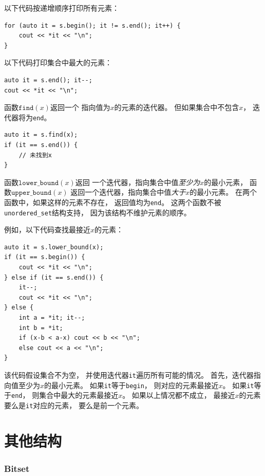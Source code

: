以下代码按递增顺序打印所有元素：
\begin{lstlisting}
for (auto it = s.begin(); it != s.end(); it++) {
    cout << *it << "\n";
}
\end{lstlisting}
以下代码打印集合中最大的元素：
\begin{lstlisting}
auto it = s.end(); it--;
cout << *it << "\n";
\end{lstlisting}

函数$\texttt{find}(x)$返回一个
指向值为$x$的元素的迭代器。
但如果集合中不包含$x$，
迭代器将为\texttt{end}。

\begin{lstlisting}
auto it = s.find(x);
if (it == s.end()) {
    // 未找到x
}
\end{lstlisting}

函数$\texttt{lower\_bound}(x)$返回
一个迭代器，指向集合中值\emph{至少为}$x$的最小元素，
函数$\texttt{upper\_bound}(x)$
返回一个迭代器，指向集合中值\emph{大于}$x$的最小元素。
在两个函数中，如果这样的元素不存在，
返回值均为\texttt{end}。
这两个函数不被\texttt{unordered\_set}结构支持，
因为该结构不维护元素的顺序。

\begin{samepage}
例如，以下代码查找最接近$x$的元素：

\begin{lstlisting}
auto it = s.lower_bound(x);
if (it == s.begin()) {
    cout << *it << "\n";
} else if (it == s.end()) {
    it--;
    cout << *it << "\n";
} else {
    int a = *it; it--;
    int b = *it;
    if (x-b < a-x) cout << b << "\n";
    else cout << a << "\n";
}
\end{lstlisting}

该代码假设集合不为空，
并使用迭代器\texttt{it}遍历所有可能的情况。
首先，迭代器指向值至少为$x$的最小元素。
如果\texttt{it}等于\texttt{begin}，
则对应的元素最接近$x$。
如果\texttt{it}等于\texttt{end}，
则集合中最大的元素最接近$x$。
如果以上情况都不成立，
最接近$x$的元素要么是\texttt{it}对应的元素，
要么是前一个元素。
\end{samepage}

\section{其他结构}

\subsubsection{Bitset}


